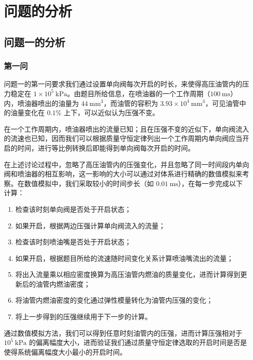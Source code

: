 \documentclass{cumcmthesis}
\begin{document}
\newpage

\section{问题的分析}
\subsection{问题一的分析}
\subsubsection{第一问}
问题一的第一问要求我们通过设置单向阀每次开启的时长，来使得高压油管内的压力稳定在 $1\times10^5~\mathrm{kPa}$。由题目所给信息，在喷油器的一个工作周期（$100~\mathrm{ms}$）内，喷油器喷出的油量为 $44~\mathrm{mm^3}$，而油管的容积为 $3.93\times 10^4~\mathrm{mm^3}$，可见油管中的油量变化在 $0.1\%$ 上下，可以近似认为压强不变。

在一个工作周期内，喷油器喷出的流量已知；且在压强不变的近似下，单向阀流入的流速也已知，因而我们可以根据质量守恒定律列出一个工作周期内单向阀应当开启的时间，进行等比例转换后即能得到单向阀每次开启的时间。

在上述讨论过程中，忽略了高压油管内的压强变化，并且忽略了同一时间段内单向阀和喷油器的相互影响，这一影响的大小可以通过对体系进行精确的数值模拟来考察。在数值模拟中，我们采取较小的时间步长（如 $0.01~\mathrm{ms}$），在每一步完成以下计算：

\begin{enumerate}
	\item 检查该时刻单向阀是否处于开启状态；
	\item 如果开启，根据两边压强计算单向阀流入的流量；
	\item 检查该时刻喷油嘴是否处于开启状态；
	\item 如果开启，根据题目所给的流速随时间变化关系计算喷油嘴流出的流量；
	\item 将出入流量乘以相应密度换算为高压油管内燃油的质量变化，进而计算得到更新后的油管内燃油密度；
	\item 将油管内燃油密度的变化通过弹性模量转化为油管内压强的变化；
	\item 将上一步得到的压强继续用于下一步的计算。
\end{enumerate}

通过数值模拟方法，我们可以得到任意时刻油管内的压强，进而计算压强相对于 $10^5~\mathrm{kPa}$ 的偏离幅度大小，进而验证我们通过质量守恒定律选取的开启时间是否是使得系统偏离幅度大小最小的开启时间。
\end{document}
